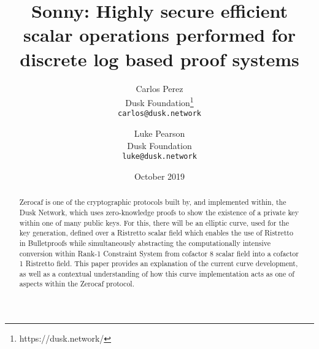\documentclass{article}
\title{Sonny: Highly secure efficient scalar operations performed for discrete log based proof systems}
\author{
  Carlos Perez\\
  Dusk Foundation\footnote{https://dusk.network/}\\
  \texttt{carlos@dusk.network}
  \and
  Luke Pearson\\
  Dusk Foundation\\
  \texttt{luke@dusk.network}
}
\date{October 2019}
\begin{document}
\maketitle
\thispagestyle{empty}
\pagestyle{empty}

\begin{abstract}
Zerocaf is one of the cryptographic protocols built by, and implemented within, the Dusk Network, which uses zero-knowledge proofs to show the existence of a private key within one of many public keys. For this, there will be an elliptic curve, used for the key generation, defined over a Ristretto scalar field which enables the use of Ristretto in Bulletproofs while simultaneously abstracting the computationally intensive conversion within Rank-1 Constraint System from cofactor 8 scalar field into a cofactor 1 Ristretto field. This paper provides an explanation of the current curve development, as well as a contextual understanding of how this curve implementation acts as one of aspects within the Zerocaf protocol. 


\end{abstract}

\newpage

\tableofcontents

\newpage
\end{document}
